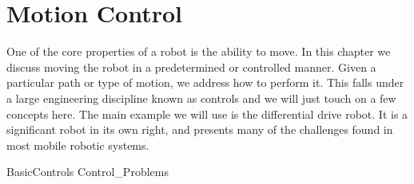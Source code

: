 \hypertarget{Chap:Control}{%
\section{Motion Control}\label{Chap:Control}}

One of the core properties of a robot is the ability to move. In this
chapter we discuss moving the robot in a predetermined or controlled
manner. Given a particular path or type of motion, we address how to
perform it. This falls under a large engineering discipline known as
controls and we will just touch on a few concepts here. The main example
we will use is the differential drive robot. It is a significant robot
in its own right, and presents many of the challenges found in most
mobile robotic systems.

BasicControls Control\_Problems
